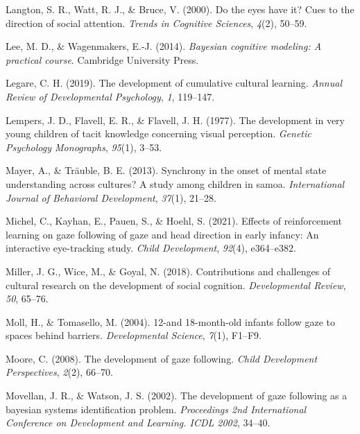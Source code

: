 \documentclass[
  man,floatsintext]{apa7}
\newlength{\cslhangindent}
\newenvironment{CSLReferences}[2] %
 {\begin{list}{}{%
  \setlength{\itemindent}{0pt}
  \setlength{\leftmargin}{0pt}
  \setlength{\parsep}{0pt}
  \ifodd #1
   \setlength{\leftmargin}{\cslhangindent}
   \setlength{\itemindent}{-1\cslhangindent}
  \fi
  \setlength{\itemsep}{#2\baselineskip}}}
 {\end{list}}
\begin{document}
\begin{CSLReferences}{1}{0}
Langton, S. R., Watt, R. J., \& Bruce, V. (2000). Do the eyes have it? Cues to the direction of social attention. \emph{Trends in Cognitive Sciences}, \emph{4}(2), 50--59.

Lee, M. D., \& Wagenmakers, E.-J. (2014). \emph{Bayesian cognitive modeling: A practical course}. Cambridge University Press.

Legare, C. H. (2019). The development of cumulative cultural learning. \emph{Annual Review of Developmental Psychology}, \emph{1}, 119--147.

Lempers, J. D., Flavell, E. R., \& Flavell, J. H. (1977). The development in very young children of tacit knowledge concerning visual perception. \emph{Genetic Psychology Monographs}, \emph{95}(1), 3--53.

Mayer, A., \& Träuble, B. E. (2013). Synchrony in the onset of mental state understanding across cultures? A study among children in samoa. \emph{International Journal of Behavioral Development}, \emph{37}(1), 21--28.

Michel, C., Kayhan, E., Pauen, S., \& Hoehl, S. (2021). Effects of reinforcement learning on gaze following of gaze and head direction in early infancy: An interactive eye-tracking study. \emph{Child Development}, \emph{92}(4), e364--e382.

Miller, J. G., Wice, M., \& Goyal, N. (2018). Contributions and challenges of cultural research on the development of social cognition. \emph{Developmental Review}, \emph{50}, 65--76.

Moll, H., \& Tomasello, M. (2004). 12-and 18-month-old infants follow gaze to spaces behind barriers. \emph{Developmental Science}, \emph{7}(1), F1--F9.

Moore, C. (2008). The development of gaze following. \emph{Child Development Perspectives}, \emph{2}(2), 66--70.

Movellan, J. R., \& Watson, J. S. (2002). The development of gaze following as a bayesian systems identification problem. \emph{Proceedings 2nd International Conference on Development and Learning. ICDL 2002}, 34--40.


\end{CSLReferences}
\end{document}
